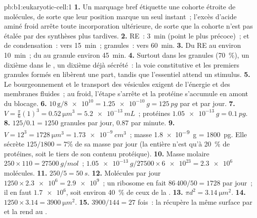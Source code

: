 \begin{solution}{pb:b1:eukaryotic-cell:1}
\textbf{1.} Un marquage bref étiquette une cohorte étroite de molécules,
de sorte que leur position marque un seul instant~; l'excès d'acide
aminé froid arrête toute incorporation ultérieure, de sorte que la
cohorte n'est pas étalée par des synthèses plus tardives.
\textbf{2.} RE~: \qty{3}{min} (point le plus précoce)~;  et
 de condensation~: vers \qty{15}{min}~; granules~: vers
\qty{60}{min}.
\textbf{3.} Du RE au  environ \qty{10}{min}~; du  au granule
environ \qty{45}{min}.
\textbf{4.} Surtout dans les granules (\qty{70}{\%}), un dixième dans le
, un dixième déjà sécrété~: la voie constitutive et les premiers
granules formés en libèrent une part, tandis que l'essentiel attend un
stimulus.
\textbf{5.} Le bourgeonnement et le transport des vésicules exigent de
l'énergie et des membranes fluides~; au froid, l'étape 
s'arrête et la protéine s'accumule en amont du blocage.
\textbf{6.} $10\,\mathrm{g}/\num{8e10} = \qty{1.25e-10}{g} =
\qty{125}{pg}$ par  et par jour.
\textbf{7.} $V = \frac{\pi}{6}(1)^3 = \qty{0.52}{\micro m^3} =
\qty{5.2e-13}{mL}$~; protéines $\qty{1.05e-13}{g} = \qty{0.1}{pg}$.
\textbf{8.} $125/0.1 = 1250$ granules par jour, $0.87$ par minute.
\textbf{9.} $V = 12^3 = \qty{1728}{\micro m^3} = \qty{1.73e-9}{cm^3}$~;
masse \qty{1.8e-9}{g} = \qty{1800}{pg}. Elle sécrète $125/1800 = 7\%$ de
sa masse par jour (la  entière n'est qu'à \qty{20}{\%} de
protéines, soit le tiers de son contenu protéique).
\textbf{10.} Masse molaire $250\times 110 = \qty{27500}{g/mol}$~;
$\qty{1.05e-13}{g}/27500\times\num{6e23} = \num{2.3e6}$ molécules.
\textbf{11.} $250/5 = \qty{50}{s}$.
\textbf{12.} Molécules par jour $1250\times\num{2.3e6} = \num{2.9e9}$~;
un ribosome en fait $86\,400/50 = 1728$ par jour~; il en faut
$\num{1.7e6}$, soit environ \qty{40}{\%} de ceux de la .
\textbf{13.} $\pi d^2 = \qty{3.14}{\micro m^2}$.
\textbf{14.} $1250\times 3.14 = \qty{3900}{\micro m^2}$.
\textbf{15.} $3900/144 = 27$ fois~: la  récupère la même surface
par  et la rend au .

\end{solution}
